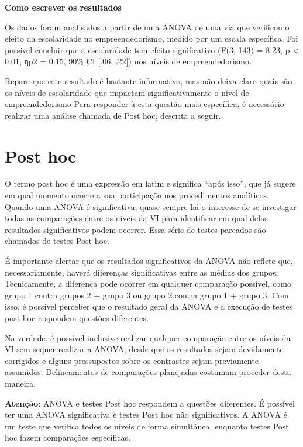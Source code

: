 \documentclass[
]{book}
\begin{document}
\textbf{Como escrever os resultados}

Os dados foram analisados a partir de uma ANOVA de uma via que verificou o efeito da escolaridade no empreendedorismo, medido por um escala específica. Foi possível concluir que a escolaridade tem efeito significativo (F(3, 143) = 8.23, p \textless{} 0.01, ηp2 = 0.15, 90\% CI {[}.06, .22{]}) nos níveis de empreendedorismo.

Repare que este resultado é bastante informativo, mas não deixa claro quais são os níveis de escolaridade que impactam significativamente o nível de empreendedorismo Para responder à esta questão mais específica, é necessário realizar uma análise chamada de Post hoc, descrita a seguir.

\hypertarget{post-hoc}{%
\section{Post hoc}\label{post-hoc}}

O termo post hoc é uma expressão em latim e significa ``após isso'', que já sugere em qual momento ocorre a sua participação nos procedimentos analíticos. Quando uma ANOVA é significativa, quase sempre há o interesse de se investigar todas as comparações entre os níveis da VI para identificar em qual delas resultados significativos podem ocorrer. Essa série de testes pareados são chamados de testes Post hoc.

É importante alertar que os resultados significativos da ANOVA não reflete que, necessariamente, haverá diferenças significativas entre as médias dos grupos. Tecnicamente, a diferença pode ocorrer em qualquer comparação possível, como grupo 1 contra grupos 2 + grupo 3 ou grupo 2 contra grupo 1 + grupo 3. Com isso, é possível perceber que o resultado geral da ANOVA e a execução de testes post hoc respondem questões diferentes.

Na verdade, é possível inclusive realizar qualquer comparação entre os níveis da VI sem sequer realizar a ANOVA, desde que os resultados sejam devidamente corrigidos e alguns pressupostos sobre os contrastes sejam previamente assumidos. Delineamentos de comparações planejadas costumam proceder desta maneira.

\textbf{Atenção}: ANOVA e testes Post hoc respondem a questões diferentes. É possível ter uma ANOVA significativa e testes Post hoc não significativos. A ANOVA é um teste que verifica todos os níveis de forma simultânea, enquanto testes Post hoc fazem comparações específicas.
\end{document}
